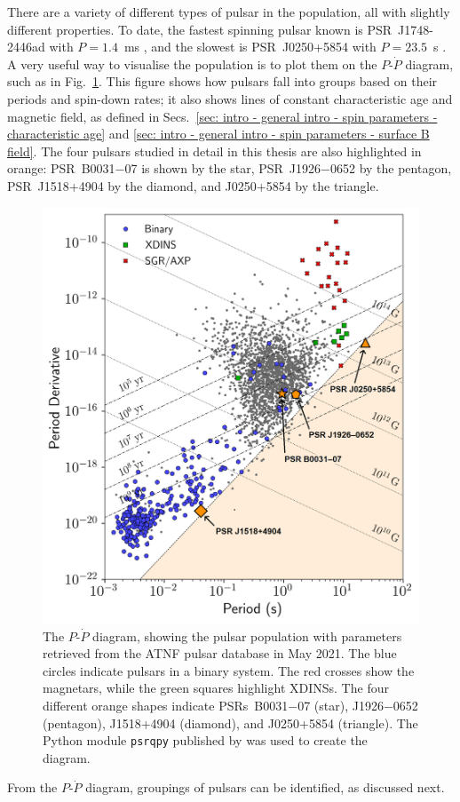 There are a variety of different types of pulsar in the population, all with slightly different properties. To date, the fastest spinning pulsar known is PSR~J1748-2446ad with $P=1.4$~ms \citep{HRS+2006}, and the slowest is PSR~J0250+5854 with $P=23.5$~s \citep[][see Chapter~\ref{chapt: J0250}]{TBC+2018}. A very useful way to visualise the population is to plot them on the $P$-$\dot{P}$ diagram, such as in Fig.~\ref{fig: intro - ppdot diagram}. This figure shows how pulsars fall into groups based on their periods and spin-down rates; it also shows lines of constant characteristic age and magnetic field, as defined in Secs.~\ref{sec: intro - general intro - spin parameters - characteristic age} and \ref{sec: intro - general intro - spin parameters - surface B field}. The four pulsars studied in detail in this thesis are also highlighted in orange: PSR~B0031$-$07 is shown by the star, PSR~J1926$-$0652 by the pentagon, PSR~J1518+4904 by the diamond, and J0250+5854 by the triangle.
\begin{figure}
    \begin{center}
        \includegraphics[width=1.0\textwidth]{Figures/Introduction/ppdot_diagram_labelled}
        \caption[The period/period derivative diagram]{The $P$-$\dot{P}$ diagram, showing the pulsar population with parameters retrieved from the ATNF pulsar database \citep{ATNFcatalogue} in May 2021. The blue circles indicate pulsars in a binary system. The red crosses show the magnetars, while the green squares highlight XDINSs. The four different orange shapes indicate PSRs~B0031$-$07 (star), J1926$-$0652 (pentagon), J1518+4904 (diamond), and J0250+5854 (triangle). The Python module \texttt{psrqpy} published by \citet{Pxxx2018} was used to create the diagram.}
        \label{fig: intro - ppdot diagram}
    \end{center}
\end{figure}
From the $P$-$\dot{P}$ diagram, groupings of pulsars can be identified, as discussed next.


